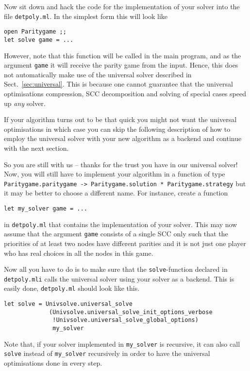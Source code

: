 Now sit down and hack the code for the implementation of your solver into the file \texttt{detpoly.ml}. In the
simplest form this will look like
\begin{verbatim}
open Paritygame ;;
let solve game = ...
\end{verbatim}
However, note that this function will be called in the main program, and as the argument \texttt{game} it will
receive the parity game from the input. Hence, this does not automatically make use of the universal solver
described in Sect.~\ref{sec:universal}. This is because one cannot guarantee that the universal optimisations
compression, SCC decomposition and solving of special cases speed up \emph{any} solver.

If your algorithm turns out to be that quick you might not want the universal optimisations in which case you
can skip the following description of how to employ the universal solver with your new algorithm as a backend
and continue with the next section.

So you are still with us -- thanks for the trust you have in our universal solver! Now, you will still have
to implement your algorithm in a function of type
\texttt{Paritygame.paritygame -> Paritygame.solution * Paritygame.strategy} but it may be better to choose
a different name. For instance, create a function
\begin{verbatim}
let my_solver game = ...
\end{verbatim}
in \texttt{detpoly.ml} that contains the implementation of your solver. This may now assume that the argument
\texttt{game} consists of a single SCC only such that the priorities of at least two nodes have different
parities and it is not just one player who has real choices in all the nodes in this game.

Now all you have to do is to make sure that the \texttt{solve}-function declared in \texttt{detpoly.mli}
calls the universal solver using your solver as a backend. This is easily done, \texttt{detpoly.ml} should
look like this.
\begin{verbatim}
let solve = Univsolve.universal_solve
             (Univsolve.universal_solve_init_options_verbose
              !Univsolve.universal_solve_global_options)
              my_solver
\end{verbatim}
Note that, if your solver implemented in \verb#my_solver# is recursive, it can also call \verb#solve# instead
of \verb#my_solver# recursively in order to have the universal optimisations done in every step.


